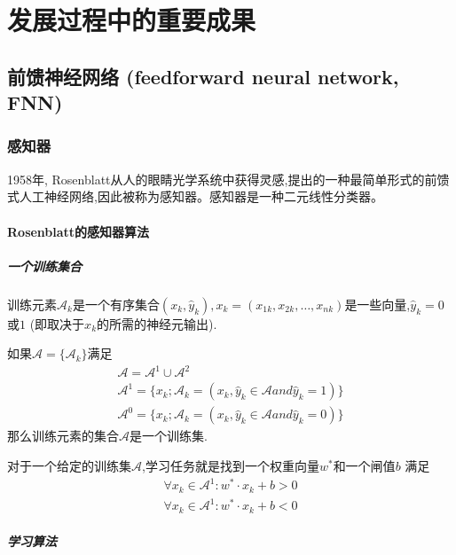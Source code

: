 \section{发展过程中的重要成果}

\subsection{前馈神经网络 (feedforward neural network, FNN)}

\subsubsection{感知器\cite{ROSENBLATT1958}}

1958年, Rosenblatt从人的眼睛光学系统中获得灵感,提出的一种最简单形式的前馈式人工神经网络,因此被称为感知器。感知器是一种二元线性分类器。


\paragraph{Rosenblatt的感知器算法}

\subparagraph{一个训练集合}

训练元素$\mathcal{A}_k$是一个有序集合$(x_k, \hat{y}_k), x_k = (x_{1k},x_{2k},\ldots, x_{nk})$是一些向量,$\hat{y}_k = 0$ 或$1$ (即取决于$x_k$的所需的神经元输出).


如果$\mathcal{A} = \{\mathcal{A}_k\}$满足
\begin{align*}
  \mathcal{A} = \mathcal{A}^1 \cup \mathcal{A}^2 \\
  \mathcal{A}^1 = \{x_k ; \mathcal{A}_k = (x_k, \hat{y}_k \in \mathcal{A} and \hat{y}_k = 1)\}\\
  \mathcal{A}^0 = \{x_k ; \mathcal{A}_k = (x_k, \hat{y}_k \in \mathcal{A} and \hat{y}_k = 0)\}
\end{align*}
那么训练元素的集合$\mathcal{A}$是一个训练集.

对于一个给定的训练集$\mathcal{A}$,学习任务就是找到一个权重向量$w^*$和一个闸值$b$ 满足
\begin{align*}
  \forall x_k \in \mathcal{A}^1 : w^* \cdot x_k + b > 0\\
  \forall x_k \in \mathcal{A}^1 : w^* \cdot x_k + b < 0
\end{align*}

\subparagraph{学习算法}

